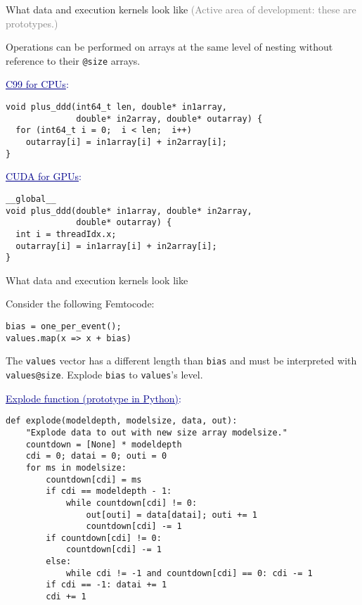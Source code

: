 \documentclass{beamer}
\begin{document}
\begin{frame}[fragile]{What data and execution kernels look like}
\vspace{0.5 cm}
\textcolor{gray}{(Active area of development: these are prototypes.)}
\small

\vspace{0.25 cm}
Operations can be performed on arrays at the same level of nesting without reference to their {\tt @size} arrays.

\vspace{0.25 cm}
\textcolor{darkblue}{\normalsize \underline{C99 for CPUs}:}
\vspace{-0.1 cm}
\begin{verbatim}
void plus_ddd(int64_t len, double* in1array,
              double* in2array, double* outarray) {
  for (int64_t i = 0;  i < len;  i++)
    outarray[i] = in1array[i] + in2array[i];
}
\end{verbatim}

\vspace{0.25 cm}
\textcolor{darkblue}{\normalsize \underline{CUDA for GPUs}:}
\vspace{-0.1 cm}
\begin{verbatim}
__global__
void plus_ddd(double* in1array, double* in2array,
              double* outarray) {
  int i = threadIdx.x;
  outarray[i] = in1array[i] + in2array[i];
}
\end{verbatim}
\end{frame}

\begin{frame}[fragile]{What data and execution kernels look like}
\scriptsize

\vspace{0.25 cm}
Consider the following Femtocode:
\begin{center}
\begin{minipage}{0.5\linewidth}
\begin{verbatim}
bias = one_per_event();
values.map(x => x + bias)
\end{verbatim}
\end{minipage}
\end{center}

The {\tt values} vector has a different length than {\tt bias} and must be interpreted with {\tt values@size}. Explode {\tt bias} to {\tt values}'s level.

\vspace{0.25 cm}
\textcolor{darkblue}{\small \underline{Explode function (prototype in Python)}:}
\begin{verbatim}
def explode(modeldepth, modelsize, data, out):
    "Explode data to out with new size array modelsize."
    countdown = [None] * modeldepth
    cdi = 0; datai = 0; outi = 0
    for ms in modelsize:
        countdown[cdi] = ms
        if cdi == modeldepth - 1:
            while countdown[cdi] != 0:
                out[outi] = data[datai]; outi += 1
                countdown[cdi] -= 1
        if countdown[cdi] != 0:
            countdown[cdi] -= 1
        else:
            while cdi != -1 and countdown[cdi] == 0: cdi -= 1
        if cdi == -1: datai += 1
        cdi += 1
\end{verbatim}
\end{frame}
\end{document}
